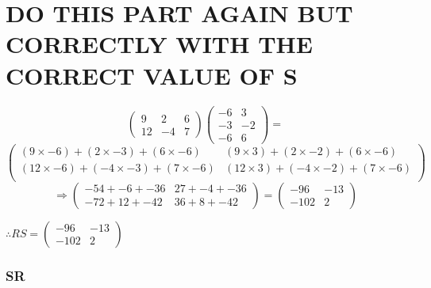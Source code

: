\documentclass{article}
\begin{document}
\section{DO THIS PART AGAIN BUT CORRECTLY WITH THE CORRECT VALUE OF S}
\[
	\begin{pmatrix}
		9 & 2 & 6\\
		12 & -4 & 7
	\end{pmatrix}
	\begin{pmatrix}
		-6 & 3\\
		-3 & -2\\
		-6 & 6
	\end{pmatrix}
	=
\]
\[
	\begin{pmatrix}
		(9\times-6)+(2\times-3)+(6\times-6) & (9\times3)+(2\times-2)+(6\times-6)\\
		(12\times-6)+(-4\times-3)+(7\times-6) & (12\times3)+(-4\times-2)+(7\times-6)\\
	\end{pmatrix}
\]
\[
	\Rightarrow
	\begin{pmatrix}
		-54+-6+-36 & 27+-4+-36\\
		-72+12+-42 & 36+8+-42
	\end{pmatrix}
	=
	\begin{pmatrix}
		-96 & -13\\
		-102 & 2
	\end{pmatrix}
\]
\begin{center}\vspace{0.5cm}$\therefore
	RS=
	\begin{pmatrix}
		-96 & -13\\
		-102 & 2
	\end{pmatrix}
$\end{center}
\subsubsection{SR}
\end{document}
